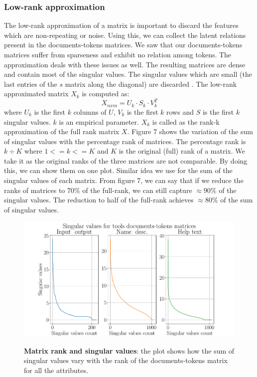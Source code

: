    \subsubsection{Low-rank approximation}
    The low-rank approximation of a matrix is important to discard the features which are non-repeating or noise. Using this, we can collect the latent relations present in the documents-tokens matrices. We saw that our documents-tokens matrices suffer from sparseness and exhibit no relation among tokens. The approximation deals with these issues as well. The resulting matrices are dense and contain most of the singular values. The singular values which are small (the last entries of the $s$ matrix along the diagonal) are discarded \cite{DBLP:journals/corr/Yang15b}. The low-rank approximated matrix $X_k$ is computed as:
    \begin{equation}
    X_{nxm} = U_{k} \cdot S_{k} \cdot V_{k}^T
    \end{equation}
    where $U_{k}$ is the first $k$ columns of $U$, $V_{k}$ is the first $k$ rows and $S$ is the first $k$ singular values. $k$ is an empirical parameter. $X_k$ is called as the rank-k approximation of the full rank matrix $X$. Figure 7 shows the variation of the sum of singular values with the percentage rank of matrices. The percentage rank is $k \div K$ where $1 <= k <= K$ and $K$ is the original (full) rank of a matrix. We take it as the original ranks of the three matrices are not comparable. By doing this, we can show them on one plot. Similar idea we use for the sum of the singular values of each matrix. From figure 7, we can say that if we reduce the ranks of matrices to $70\%$ of the full-rank, we can still capture $\approx 90\%$ of the singular values. The reduction to half of the full-rank achieves $\approx 80\%$ of the sum of singular values. 

\begin{figure}[h]
\begin{centering}
    {\includegraphics[scale=0.45]{figures/singular_values.pdf}}
    \caption[Rank singular values]{\textbf{Matrix rank and singular values}: the plot shows how the sum of singular values vary with the rank of the documents-tokens matrix for all the attributes.}
\end{centering}
\end{figure}


